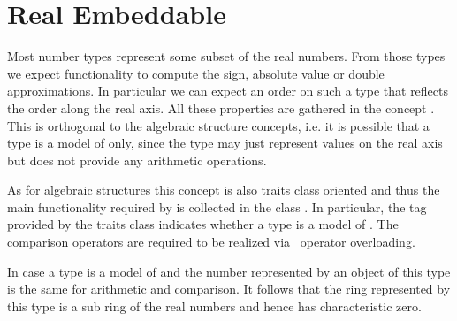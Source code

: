 \section{Real Embeddable}

Most number types represent some subset of the real numbers. From those types 
we expect functionality to compute the sign, absolute value or double 
approximations. In particular we can expect an order on such a type that reflects 
the order along the real axis. 
All these properties are gathered in the concept . 
This is orthogonal to the algebraic structure concepts, i.e. it is possible that a
type is a model of  only, 
since the type may just represent values on the real axis
but does not provide any arithmetic operations.

As for algebraic structures this concept is also traits class oriented and 
thus the main functionality required by  is collected in 
the class . In particular, the tag 
 provided by the traits class indicates
whether a type is a model of .
The comparison operators
are required to be realized via \CC\ operator overloading.

In case a type is a model of  and  
 the number represented by an object of this type is 
the same for arithmetic and comparison.
It follows that the ring represented by this type is a sub ring of the real
numbers and hence has characteristic zero.


